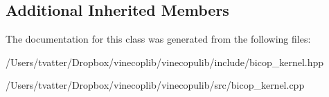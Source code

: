 \subsection*{Additional Inherited Members}


The documentation for this class was generated from the following files\+:\begin{DoxyCompactItemize}
\item 
/\+Users/tvatter/\+Dropbox/vinecoplib/vinecopulib/include/bicop\+\_\+kernel.\+hpp\item 
/\+Users/tvatter/\+Dropbox/vinecoplib/vinecopulib/src/bicop\+\_\+kernel.\+cpp\end{DoxyCompactItemize}
